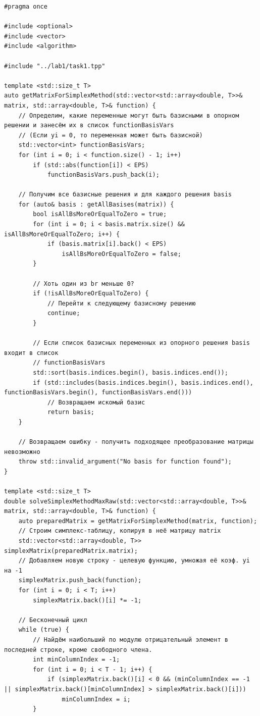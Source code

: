 \documentclass[a4paper,14pt]{extarticle}
\begin{document}
\begin{verbatim}
#pragma once 

#include <optional>
#include <vector>
#include <algorithm>

#include "../lab1/task1.tpp"

template <std::size_t T>
auto getMatrixForSimplexMethod(std::vector<std::array<double, T>>& matrix, std::array<double, T>& function) {
    // Определим, какие переменные могут быть базисными в опорном решении и занесём их в список functionBasisVars
    // (Если yi = 0, то переменная может быть базисной)
    std::vector<int> functionBasisVars;
    for (int i = 0; i < function.size() - 1; i++) 
        if (std::abs(function[i]) < EPS) 
            functionBasisVars.push_back(i);
    
    // Получим все базисные решения и для каждого решения basis
    for (auto& basis : getAllBasises(matrix)) {
        bool isAllBsMoreOrEqualToZero = true;
        for (int i = 0; i < basis.matrix.size() && isAllBsMoreOrEqualToZero; i++) {
            if (basis.matrix[i].back() < EPS) 
                isAllBsMoreOrEqualToZero = false;
        }

        // Хоть один из br меньше 0?
        if (!isAllBsMoreOrEqualToZero) { 
            // Перейти к следующему базисному решению
            continue;
        }

        // Если список базисных переменных из опорного решения basis входит в список
        // functionBasisVars
        std::sort(basis.indices.begin(), basis.indices.end());
        if (std::includes(basis.indices.begin(), basis.indices.end(), functionBasisVars.begin(), functionBasisVars.end()))
            // Возвращаем искомый базис
            return basis;
    }

    // Возвращаем ошибку - получить подходящее преобразование матрицы невозможно
    throw std::invalid_argument("No basis for function found");
}

template <std::size_t T>
double solveSimplexMethodMaxRaw(std::vector<std::array<double, T>>& matrix, std::array<double, T>& function) {
    auto preparedMatrix = getMatrixForSimplexMethod(matrix, function);
    // Строим симплекс-таблицу, копируя в неё матрицу matrix
    std::vector<std::array<double, T>> simplexMatrix(preparedMatrix.matrix);
    // Добавляем новую строку - целевую функцию, умножая её коэф. yi на -1
    simplexMatrix.push_back(function);
    for (int i = 0; i < T; i++)
        simplexMatrix.back()[i] *= -1;

    // Бесконечный цикл
    while (true) {
        // Найдём наибольший по модулю отрицательный элемент в последней строке, кроме свободного члена.
        int minColumnIndex = -1;
        for (int i = 0; i < T - 1; i++) {
            if (simplexMatrix.back()[i] < 0 && (minColumnIndex == -1 || simplexMatrix.back()[minColumnIndex] > simplexMatrix.back()[i]))
                minColumnIndex = i;
        }


\end{verbatim}
\end{document}
